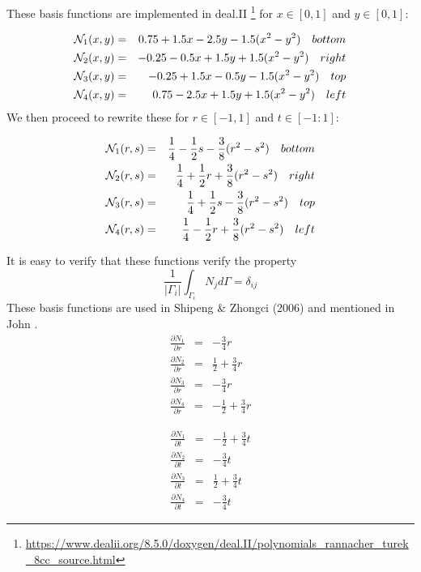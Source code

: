 These basis functions are implemented in deal.II
\footnote{\url{https://www.dealii.org/8.5.0/doxygen/deal.II/polynomials_rannacher_turek_8cc_source.html}}
for $x\in[0,1]$ and $y\in[0,1]$:

\begin{eqnarray}
{\mathcal{N}}_1(x,y) &=&  0.75 + 1.5x - 2.5y -1.5(x^2-y^2) \quad bottom\\
{\mathcal{N}}_2(x,y) &=& -0.25 - 0.5x + 1.5y +1.5(x^2-y^2) \quad right\\
{\mathcal{N}}_3(x,y) &=& -0.25 + 1.5x - 0.5y -1.5(x^2-y^2) \quad top\\
{\mathcal{N}}_4(x,y) &=&  0.75 - 2.5x + 1.5y +1.5(x^2-y^2) \quad left
\end{eqnarray}
We then proceed to rewrite these for $r\in[-1,1]$ and $t\in[-1:1]$:
\begin{mdframed}[backgroundcolor=blue!5]
\begin{eqnarray}
{\mathcal{N}}_1(r,s) &=& \frac{1}{4} -\frac{1}{2}s - \frac{3}{8}(r^2-s^2) \quad bottom \\
{\mathcal{N}}_2(r,s) &=& \frac{1}{4} +\frac{1}{2}r + \frac{3}{8}(r^2-s^2) \quad right \\
{\mathcal{N}}_3(r,s) &=& \frac{1}{4} +\frac{1}{2}s - \frac{3}{8}(r^2-s^2) \quad top \\
{\mathcal{N}}_4(r,s) &=& \frac{1}{4} -\frac{1}{2}r + \frac{3}{8}(r^2-s^2) \quad left
\end{eqnarray}
\end{mdframed}
It is easy to verify that these functions verify the property
\[
\frac{1}{|\Gamma_i|} \int_{\Gamma_i} N_j d\Gamma = \delta_{ij}
\]
These basis functions are used in Shipeng \& Zhongci (2006) \cite{shzh06} 
and mentioned in John \cite[p.722]{john16}.
\begin{eqnarray}
\frac{\partial N_1}{\partial r} &=& -\frac{3}{4}r \nonumber\\
\frac{\partial N_2}{\partial r} &=& \frac{1}{2}+\frac{3}{4}r \nonumber\\
\frac{\partial N_3}{\partial r} &=& -\frac{3}{4}r \nonumber\\
\frac{\partial N_4}{\partial r} &=& -\frac{1}{2}+\frac{3}{4}r \nonumber
\end{eqnarray}

\begin{eqnarray}
\frac{\partial N_1}{\partial t} &=& -\frac{1}{2}+\frac{3}{4}t \nonumber\\
\frac{\partial N_2}{\partial t} &=& -\frac{3}{4}t \nonumber\\
\frac{\partial N_3}{\partial t} &=& \frac{1}{2}+\frac{3}{4}t \nonumber\\
\frac{\partial N_4}{\partial t} &=& -\frac{3}{4}t \nonumber
\end{eqnarray}

